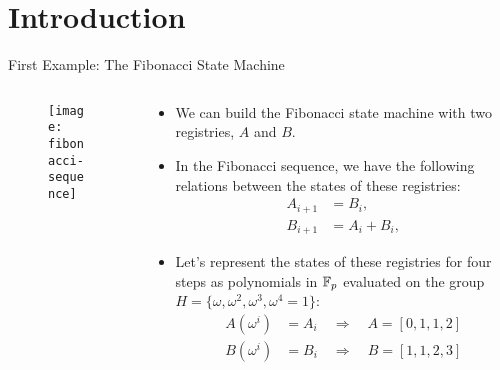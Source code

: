 
\section{Introduction}

\begin{frame}[allowframebreaks]{First Example: The Fibonacci State Machine}

\begin{columns}
\begin{column}{0.3\textwidth}
\begin{figure}
	\texttt{[image: fibonacci-sequence]}
\end{figure}
\end{column}
\begin{column}{0.7\textwidth}
\begin{itemize}
\item We can build the Fibonacci state machine with two registries, $A$ and $B$.
\item In the Fibonacci sequence, we have the following relations between the states of these registries:
\begin{align*}
A_{i+1} &= B_i, \\
B_{i+1} &= A_i + B_i,
\end{align*}

\item Let's represent the states of these registries for four steps as polynomials in $\mathbb{F}_p$ evaluated 
on the group $H = \{\omega, \omega^2, \omega^3, \omega^4 = 1\}$:
\begin{align*}
A(\omega^i) &= A_i \quad \Longrightarrow \quad A = [0, 1, 1, 2] \\
B(\omega^i) &= B_i \quad \Longrightarrow \quad B = [1, 1, 2, 3]
\end{align*}
\end{itemize}
\end{column}
\end{columns}



\end{frame}
